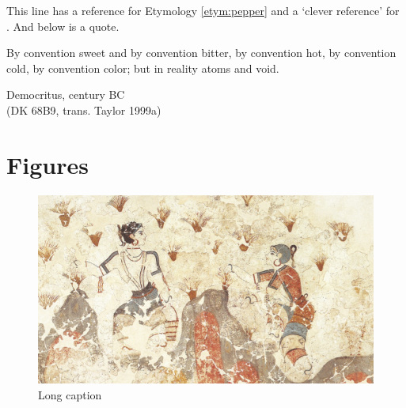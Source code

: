 This line has a reference for Etymology \ref{etym:pepper} and a `clever reference' for . And below is a quote.

\epigraph{By convention sweet and by convention bitter, by convention hot, by convention cold, by convention color; but in reality atoms and void.}{Democritus,  century BC\\(DK 68B9, trans. Taylor 1999a)}

\section{Figures}

\begin{figure}[ht]
    \includegraphics[width=\linewidth]{imgs/saffron_gatherers.jpg}
    \caption[Short caption to ToC]{Long caption}
    \label{fig:saffron1}
\end{figure}


